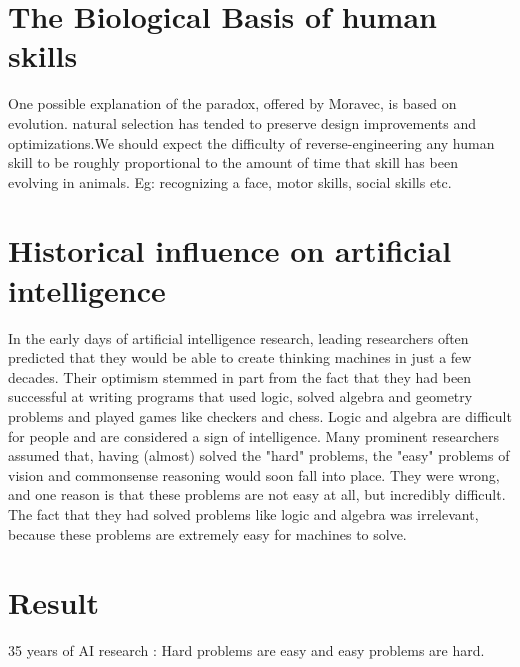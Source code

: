 \documentclass[a4paper,10pt]{article} %
\begin{document}
\section{The Biological Basis of human skills}
One possible explanation of the paradox, offered by Moravec, is based on evolution. natural selection has tended to preserve design improvements and optimizations.We should expect the difficulty of reverse-engineering any human skill to be roughly proportional to the amount of time that skill has been evolving in animals.
Eg: recognizing a face, motor skills, social skills etc.
\printbibliography

\section{Historical influence on artificial intelligence}
In the early days of artificial intelligence research, leading researchers often predicted that they would be able to create thinking machines in just a few decades. Their optimism stemmed in part from the fact that they had been successful at writing programs that used logic, solved algebra and geometry problems and played games like checkers and chess. Logic and algebra are difficult for people and are considered a sign of intelligence. Many prominent researchers assumed that, having (almost) solved the "hard" problems, the "easy" problems of vision and commonsense reasoning would soon fall into place. They were wrong, and one reason is that these problems are not easy at all, but incredibly difficult. The fact that they had solved problems like logic and algebra was irrelevant, because these problems are extremely easy for machines to solve.
\section{Result}
35 years of AI research : Hard problems are easy and easy problems are hard.
\end{document}
